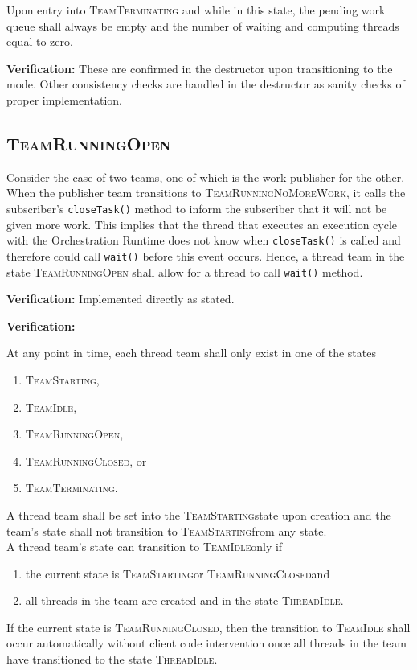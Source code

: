 \documentclass{article}
\newcommand{\TeamStarting}      {\textsc{TeamStarting}}
\newcommand{\TeamIdle}          {\textsc{TeamIdle}}
\newcommand{\TeamRunningOpen}   {\textsc{TeamRunningOpen}}
\newcommand{\TeamRunningClosed} {\textsc{TeamRunningClosed}}
\newcommand{\TeamRunningNoMoreWork} {\textsc{TeamRunningNoMoreWork}}
\newcommand{\TeamTerminating}   {\textsc{TeamTerminating}}
\newcommand{\ThreadIdle}        {\textsc{ThreadIdle}}
\begin{document}
\begin{req}
Upon entry into {\TeamTerminating} and while in this state, the pending work
queue shall always be empty and the number of waiting and computing threads
equal to zero.
\end{req}
\textbf{Verification:}\hspace{0.125in}  These are confirmed in the destructor
upon transitioning to the mode.  Other consistency checks are handled in the
destructor as sanity checks of proper implementation.

\subsection{\TeamRunningOpen}
\begin{req}
Consider the case of two teams, one of which is the work publisher for the
other.  When the publisher team transitions to {\TeamRunningNoMoreWork}, it
calls the subscriber's \texttt{closeTask()} method to inform the subscriber that
it will not be given more work.  This implies that the thread that executes an
execution cycle with the Orchestration Runtime does not know when
\texttt{closeTask()} is called and therefore could call \texttt{wait()} before
this event occurs.  Hence, a thread team in the state {\TeamRunningOpen} shall
allow for a thread to call \texttt{wait()} method.
\end{req}
\textbf{Verification:}\hspace{0.125in}  Implemented directly as stated.

\begin{req}
\end{req}
\textbf{Verification:}\hspace{0.125in}


At any point in time, each thread team shall only exist in one of the states
\begin{enumerate}
\item{\TeamStarting,}
\item{\TeamIdle,}
\item{\TeamRunningOpen,}
\item{\TeamRunningClosed, or}
\item{\TeamTerminating.}
\end{enumerate}

A thread team shall be set into the \TeamStarting state upon creation and the
team's state shall not transition to \TeamStarting from any state. \\

A thread team's state can transition to \TeamIdle only if
\begin{enumerate}
\item{the current state is \TeamStarting or \TeamRunningClosed and}
\item{all threads in the team are created and in the state \ThreadIdle.}
\end{enumerate}
If the current state is \TeamRunningClosed, then the transition to \TeamIdle
shall occur automatically without client code intervention once all threads in
the team have transitioned to the state \ThreadIdle.\\
\end{document}
